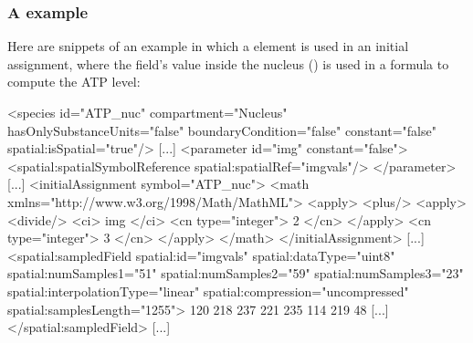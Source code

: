 \subsubsection{A \SampledField example}
Here are snippets of an example in which a \SampledField element is used in an initial assignment, where the field's value inside the nucleus () is used in a formula to compute the ATP level:

\begin{example}
[...]
  <species id="ATP_nuc" compartment="Nucleus" hasOnlySubstanceUnits="false"
           boundaryCondition="false" constant="false" spatial:isSpatial="true"/>
[...]
  <parameter id="img" constant="false">
    <spatial:spatialSymbolReference spatial:spatialRef="imgvals"/>
  </parameter>
[...]
  <initialAssignment symbol="ATP_nuc">
    <math xmlns="http://www.w3.org/1998/Math/MathML">
      <apply>
        <plus/>
        <apply>
          <divide/>
          <ci> img </ci>
          <cn type="integer"> 2 </cn>
        </apply>
        <cn type="integer"> 3 </cn>
      </apply>
    </math>
  </initialAssignment>
[...]
  <spatial:sampledField spatial:id="imgvals" spatial:dataType="uint8"
           spatial:numSamples1="51" spatial:numSamples2="59"
           spatial:numSamples3="23" spatial:interpolationType="linear"
           spatial:compression="uncompressed" spatial:samplesLength="1255">
    120 218 237 221 235 114 219 48 [...]
  </spatial:sampledField>
[...]
\end{example}


